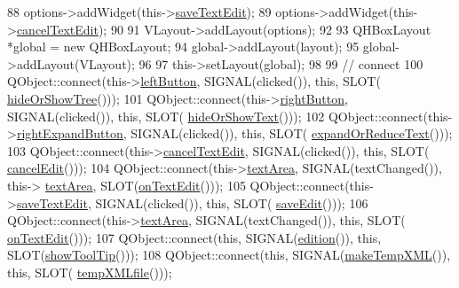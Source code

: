 \begin{DoxyCode}
88     options->addWidget(this->\hyperlink{classArea_a9f02653780f96daba713c2e71e562da6}{saveTextEdit});
89     options->addWidget(this->\hyperlink{classArea_a48b08ee11ec952b793e8d92dfc9ef7d4}{cancelTextEdit});
90 
91     VLayout->addLayout(options);
92 
93     QHBoxLayout *global = \textcolor{keyword}{new} QHBoxLayout;
94     global->addLayout(layout);
95     global->addLayout(VLayout);
96 
97     this->setLayout(global);
98 
99     \textcolor{comment}{// connect}
100     QObject::connect(this->\hyperlink{classArea_ac3abf6be3202aedd2cc9ccf8da053989}{leftButton}, SIGNAL(clicked()), \textcolor{keyword}{this}, SLOT(
      \hyperlink{classArea_a2972e1d905e8e118d51903e4fccb3648}{hideOrShowTree}()));
101     QObject::connect(this->\hyperlink{classArea_a7dda00e73b5dda5bcf308bc9451d47aa}{rightButton}, SIGNAL(clicked()), \textcolor{keyword}{this}, SLOT(
      \hyperlink{classArea_a36014f76da996d4d3177fab5af44b42d}{hideOrShowText}()));
102     QObject::connect(this->\hyperlink{classArea_abe2c125e65ad35f1a154ec4b044a7cf1}{rightExpandButton}, SIGNAL(clicked()), \textcolor{keyword}{this}, SLOT(
      \hyperlink{classArea_a124912e5857e74fe14f65b15330a493b}{expandOrReduceText}()));
103     QObject::connect(this->\hyperlink{classArea_a48b08ee11ec952b793e8d92dfc9ef7d4}{cancelTextEdit}, SIGNAL(clicked()), \textcolor{keyword}{this}, SLOT(
      \hyperlink{classArea_afbffb8cb88542aa9b70e1ef5fb00f47a}{cancelEdit}()));
104     QObject::connect(this->\hyperlink{classArea_a001e5b841c3e4126a128de13171f05d3}{textArea}, SIGNAL(textChanged()), this->
      \hyperlink{classArea_a001e5b841c3e4126a128de13171f05d3}{textArea}, SLOT(\hyperlink{classArea_a40389ebbbb18a08cfe7f8257af8600d1}{onTextEdit}()));
105     QObject::connect(this->\hyperlink{classArea_a9f02653780f96daba713c2e71e562da6}{saveTextEdit}, SIGNAL(clicked()), \textcolor{keyword}{this}, SLOT(
      \hyperlink{classArea_a2f682bc0956a716b4997dd0c82111246}{saveEdit}()));
106     QObject::connect(this->\hyperlink{classArea_a001e5b841c3e4126a128de13171f05d3}{textArea}, SIGNAL(textChanged()), \textcolor{keyword}{this}, SLOT(
      \hyperlink{classArea_a40389ebbbb18a08cfe7f8257af8600d1}{onTextEdit}()));
107     QObject::connect(\textcolor{keyword}{this}, SIGNAL(\hyperlink{classArea_a1e7dcab3e158c58d22d4f5096336b784}{edition}()), \textcolor{keyword}{this}, SLOT(\hyperlink{classArea_add92db2a542dbd1d6e3611834615eb09}{showToolTip}()));
108     QObject::connect(\textcolor{keyword}{this}, SIGNAL(\hyperlink{classArea_af1d326edb69ae3b42235b93ed664c691}{makeTempXML}()), \textcolor{keyword}{this}, SLOT(
      \hyperlink{classArea_a9dfe0c8071d54a82eb9f5d0d939e4e82}{tempXMLfile}()));

\end{DoxyCode}
